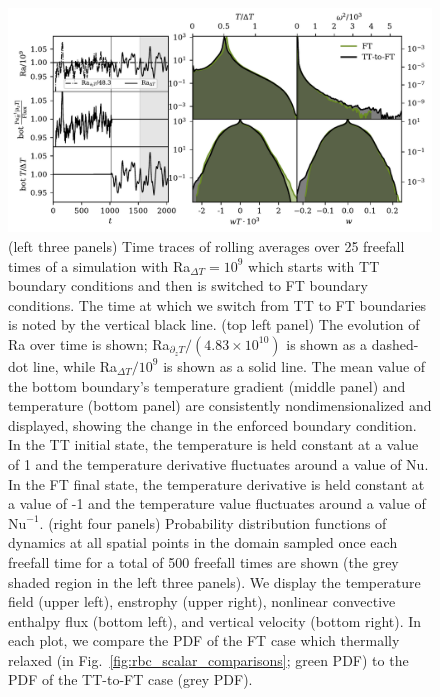 \documentclass[aps, pre, onecolumn, nofootinbib, notitlepage, groupedaddress, amsfonts, amssymb, amsmath, longbibliography, superscriptaddress]{revtex4-1}
\begin{document}
\begin{figure}
\includegraphics[width=\textwidth]{./figs/rbc_restart_description.pdf}
\caption{ 
	(left three panels) Time traces of rolling averages over 25 freefall times of a simulation with Ra$_{\Delta T} = 10^9$ which starts with TT boundary conditions and then is switched to FT boundary conditions.
	The time at which we switch from TT to FT boundaries is noted by the vertical black line.
	(top left panel) The evolution of Ra over time is shown; Ra$_{\partial_z T}/(4.83\times 10^{10})$ is shown as a dashed-dot line, while Ra$_{\Delta T}/10^9$ is shown as a solid line.
	The mean value of the bottom boundary's temperature gradient (middle panel) and temperature (bottom panel) are consistently nondimensionalized and displayed, showing the change in the enforced boundary condition.
	In the TT initial state, the temperature is held constant at a value of 1 and the temperature derivative fluctuates around a value of $\text{Nu}$.
	In the FT final state, the temperature derivative is held constant at a value of -1 and the temperature value fluctuates around a value of $\text{Nu}^{-1}$.
	(right four panels) Probability distribution functions of dynamics at all spatial points in the domain sampled once each freefall time for a total of 500 freefall times are shown (the grey shaded region in the left three panels).
	We display the temperature field (upper left), enstrophy (upper right), nonlinear convective enthalpy flux (bottom left), and vertical velocity (bottom right).
	In each plot, we compare the PDF of the FT case which thermally relaxed (in Fig.~\ref{fig:rbc_scalar_comparisons}; green PDF) to the PDF of the TT-to-FT case (grey PDF).
\label{fig:rbc_restart_description} }
\end{figure}
\end{document}
